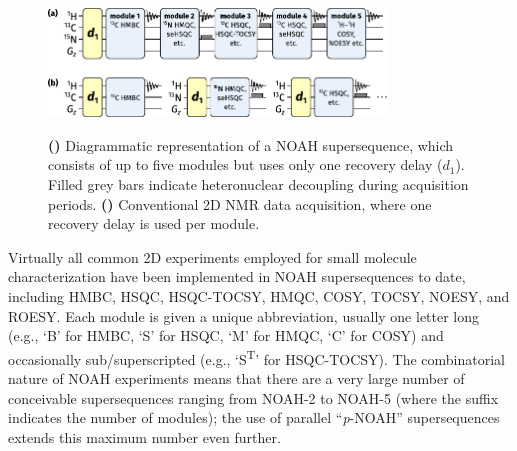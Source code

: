 \documentclass[a4paper,11pt]{article}
\begin{document}
\begin{refsection}
\begin{figure}
    \centering
    \includegraphics[width=0.8\textwidth]{noah_diagram.pdf}
    {\label{fig:noah_diagram_noah}}
    {\label{fig:noah_diagram_conventional}}
    \caption{
        \textbf{()} Diagrammatic representation of a NOAH supersequence, which consists of up to five modules but uses only one recovery delay (\(d_1\)).
        Filled grey bars indicate heteronuclear decoupling during acquisition periods.
        \textbf{()} Conventional 2D NMR data acquisition, where one recovery delay is used per module.
    }
    \label{fig:noah_diagram}
\end{figure}

Virtually all common 2D experiments employed for small molecule characterization have been implemented in NOAH supersequences to date, including HMBC, HSQC, HSQC-TOCSY, HMQC, COSY, TOCSY, NOESY, and ROESY.
Each module is given a unique abbreviation, usually one letter long (e.g., `B' for HMBC, `S' for HSQC, `M' for HMQC, `C' for COSY) and occasionally sub/superscripted (e.g., `S\textsuperscript{T}' for HSQC-TOCSY).
The combinatorial nature of NOAH experiments means that there are a very large number of conceivable supersequences ranging from NOAH-2 to NOAH-5 (where the suffix indicates the number of modules); the use of parallel ``\textit{p}-NOAH'' supersequences\autocite{Kupce2021JACSA} extends this maximum number even further.


\end{refsection}
\end{document}
